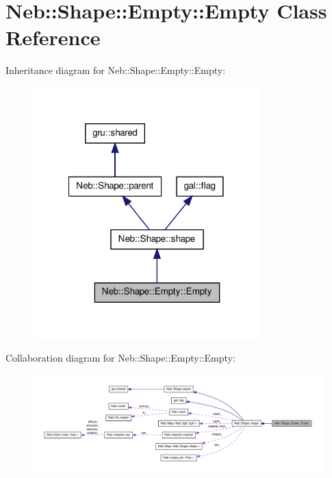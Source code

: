 \hypertarget{classNeb_1_1Shape_1_1Empty_1_1Empty}{\section{\-Neb\-:\-:\-Shape\-:\-:\-Empty\-:\-:\-Empty \-Class \-Reference}
\label{classNeb_1_1Shape_1_1Empty_1_1Empty}
}


\-Inheritance diagram for \-Neb\-:\-:\-Shape\-:\-:\-Empty\-:\-:\-Empty\-:\nopagebreak
\begin{figure}[H]
\begin{center}
\leavevmode
\includegraphics[width=248pt]{classNeb_1_1Shape_1_1Empty_1_1Empty__inherit__graph}
\end{center}
\end{figure}


\-Collaboration diagram for \-Neb\-:\-:\-Shape\-:\-:\-Empty\-:\-:\-Empty\-:\nopagebreak
\begin{figure}[H]
\begin{center}
\leavevmode
\includegraphics[width=350pt]{classNeb_1_1Shape_1_1Empty_1_1Empty__coll__graph}
\end{center}
\end{figure}
